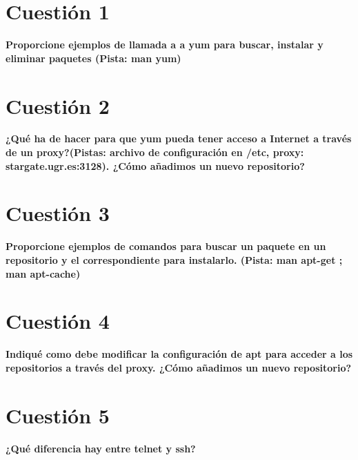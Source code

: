 \documentclass[a4paper,11pt]{article}
\newenvironment{answer}{%
\begin{list}{}{%
}%
\item[]}{\end{list}}
\newcommand{\imagent}[4]{
  \begin{figure}
    \begin{center}
    \texttt{[image: \#1]}
    \end{center}
    \caption{#3}
    \label{#4}
  \end{figure}
}
\newcommand{\imagen}[4]{
  \begin{minipage}{\linewidth}
    \centering
    \texttt{[image: \#1]}
    \captionof{figure}{#2}
    \label{#3}
  \end{minipage} 
}
\begin{document}
\newpage
\tableofcontents
\newpage

\section{Cuestión 1}
\textbf{Proporcione ejemplos de llamada a a yum para buscar, instalar y eliminar paquetes (Pista: man yum)}
\begin{answer}
  
\end{answer}

\section{Cuestión 2}
\textbf{¿Qué ha de hacer para que yum pueda tener acceso a Internet a través de un proxy?(Pistas: archivo de configuración
en /etc, proxy: stargate.ugr.es:3128). ¿Cómo añadimos un nuevo repositorio?}
\begin{answer}
  
\end{answer}

\section{Cuestión 3}
\textbf{Proporcione ejemplos de comandos para buscar un paquete en un repositorio y el correspondiente para instalarlo. 
(Pista: man apt-get ; man apt-cache)}
\begin{answer}
  
\end{answer}

\section{Cuestión 4}
\textbf{Indiqué como debe modificar la configuración de apt para acceder a los repositorios a través del proxy. ¿Cómo 
añadimos un nuevo repositorio?}
\begin{answer}
  
\end{answer}

\section{Cuestión 5}
\textbf{¿Qué diferencia hay entre telnet y ssh?}
\begin{answer}
  
\end{answer}
\end{document}

